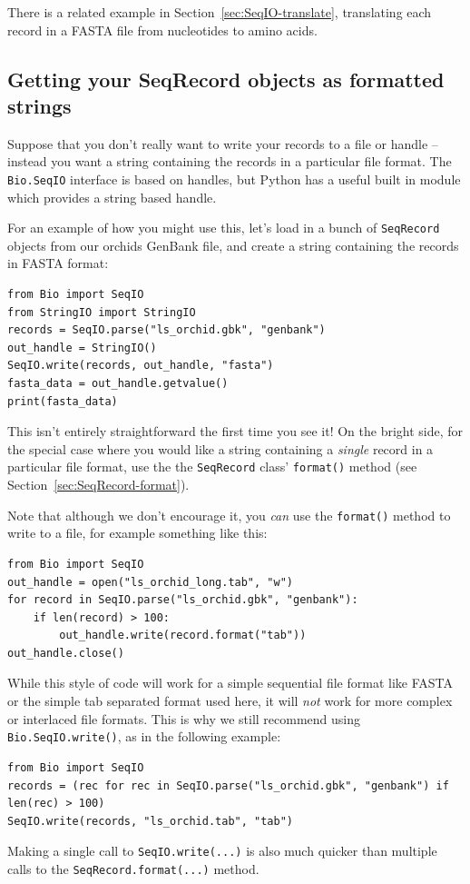 \documentclass{report}
\begin{document}
There is a related example in Section~\ref{sec:SeqIO-translate}, translating each
record in a FASTA file from nucleotides to amino acids.

\subsection{Getting your SeqRecord objects as formatted strings}
\label{sec:Bio.SeqIO-and-StringIO}
Suppose that you don't really want to write your records to a file or handle -- instead you want a string containing the records in a particular file format.  The \verb|Bio.SeqIO| interface is based on handles, but Python has a useful built in module which provides a string based handle.

For an example of how you might use this, let's load in a bunch of \verb|SeqRecord| objects from our orchids GenBank file, and create a string containing the records in FASTA format:

\begin{verbatim}
from Bio import SeqIO
from StringIO import StringIO
records = SeqIO.parse("ls_orchid.gbk", "genbank")
out_handle = StringIO()
SeqIO.write(records, out_handle, "fasta")
fasta_data = out_handle.getvalue()
print(fasta_data)
\end{verbatim}

This isn't entirely straightforward the first time you see it!  On the bright side, for the special case where you would like a string containing a \emph{single} record in a particular file format, use the the \verb|SeqRecord| class' \verb|format()| method (see Section~\ref{sec:SeqRecord-format}).

Note that although we don't encourage it, you \emph{can} use the \verb|format()| method to write to a file, for example something like this:
\begin{verbatim}
from Bio import SeqIO
out_handle = open("ls_orchid_long.tab", "w")
for record in SeqIO.parse("ls_orchid.gbk", "genbank"):
    if len(record) > 100:
        out_handle.write(record.format("tab"))
out_handle.close()
\end{verbatim}
\noindent While this style of code will work for a simple sequential file format like FASTA or the simple tab separated format used here, it will \emph{not} work for more complex or interlaced file formats.  This is why we still recommend using \verb|Bio.SeqIO.write()|, as in the following example:
\begin{verbatim}
from Bio import SeqIO
records = (rec for rec in SeqIO.parse("ls_orchid.gbk", "genbank") if len(rec) > 100)
SeqIO.write(records, "ls_orchid.tab", "tab")
\end{verbatim}
\noindent Making a single call to \verb|SeqIO.write(...)| is also much quicker than
multiple calls to the \verb|SeqRecord.format(...)| method.
\end{document}
